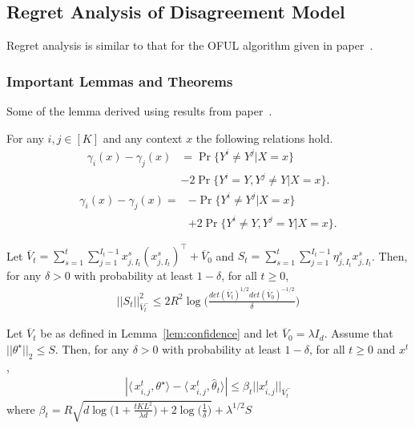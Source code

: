 \subsection{Regret Analysis of Disagreement Model}
\label{sec:dma_regret}
Regret analysis is similar to that for the OFUL algorithm given in paper~\cite{abbasi2011improved}.

\subsubsection{Important Lemmas and Theorems}
\label{sec:dma_regret_lemmas}
Some of the lemma derived using results from paper~\cite{abbasi2011improved, hanawal2017unsupervised}.
\begin{lem}
For any $i,j \in [K] $ and any context $x$ the following relations hold.
\begin{align}
\label{eqn:disagree1}
\gamma_i(x)-\gamma_j(x)& = \Pr\{Y^i \neq Y^j|X=x\}  \nonumber \\
&-2\Pr\{Y^i=Y, Y^j \neq Y|X=x\}.
\end{align}	
\begin{align}
\label{eqn:disagree2}
\gamma_i(x)-\gamma_j(x) =& -\Pr\{Y^i \neq Y^j|X=x\} \nonumber \\
&+2\Pr\{Y^i \neq Y, Y^j = Y|X=x\}.
\end{align}	
\end{lem}
		
\begin{lem}
	\label{lem:confidence}
	Let $\overline{V}_t = \sum_{s=1}^{t}\sum_{j=1}^{I_t-1}x_{j, I_t}^s(x_{j, I_t}^s)^\top + \overline{V}_0$ and $S_t = \sum_{s=1}^{t}\sum_{j=1}^{I_t-1}\eta_{j,I_t}^sx_{j, I_t}^s$. Then, for any $\delta > 0 $ with probability at least $1-\delta$, for all $t \geq 0$,
	\begin{align*}
	||S_t||_{\overline{V}_t^-}^2 \le 2R^2\log\bigg(\frac{det(\overline{V}_t)^{1/2}det(\overline{V}_0)^{-1/2}}{\delta}\bigg)
	\end{align*}
\end{lem}

\begin{lem}
	\label{lem:diff} 
	Let $\overline{V}_t$ be as defined in Lemma~\ref{lem:confidence} and  let $\overline{V}_0 =\lambda I_d$. Assume that $||\theta^\star||_2 \le S$. Then, for any $\delta > 0$ with probability at least $1-\delta$, for all $t \ge 0$ and $ x^t$,
	\begin{align*}
	|\langle\,x_{i, j}^t, \theta^\star\rangle - \langle\,x_{i, j}^t, \widehat{\theta}_t\rangle|\le \beta_t||x_{i,j}^t||_{\overline{V}^-_t}
	\end{align*}
	where $\beta_t = R\sqrt{d\log\bigg(1 + \frac{tKL^2}{\lambda d}\bigg) + 2\log\bigg(\frac{1}{\delta}\bigg)} + \lambda^{1/2}S$ 
\end{lem}

